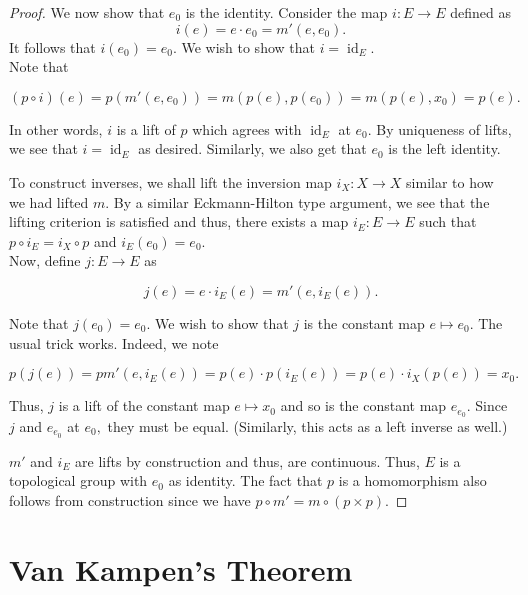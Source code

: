 \documentclass[12pt]{article}
\theoremstyle{definition}
\numberwithin{thm}{section}
\newcommand{\id}{\operatorname{id}}
\begin{document}
\begin{proof}
	We now show that $e_0$ is the identity. Consider the map $i:E \to E$ defined as
	\begin{equation*} 
		i(e) = e\cdot e_0 = m'(e, e_0).
	\end{equation*}
	It follows that $i(e_0) = e_0.$ We wish to show that $i = \id_E.$ \\
	Note that
	
	\begin{equation*} 
		(p\circ i)(e) = p(m'(e, e_0)) = m(p(e), p(e_0)) = m(p(e), x_0) = p(e).
	\end{equation*}
	
	In other words, $i$ is a lift of $p$ which agrees with $\id_E$ at $e_0.$ By uniqueness of lifts, we see that $i = \id_E$ as desired. Similarly, we also get that $e_0$ is the left identity.

	To construct inverses, we shall lift the inversion map $i_X:X \to X$ similar to how we had lifted $m.$ By a similar Eckmann-Hilton type argument, we see that the lifting criterion is satisfied and thus, there exists a map $i_E:E \to E$ such that $p\circ i_E = i_X\circ p$ and $i_E(e_0) = e_0.$\\
	Now, define $j:E \to E$ as
	
	\begin{equation*} 
		j(e) = e\cdot i_E(e) = m'(e, i_E(e)).
	\end{equation*}

	Note that $j(e_0) = e_0.$ We wish to show that $j$ is the constant map $e\mapsto e_0.$ The usual trick works. Indeed, we note

	\begin{equation*} 
		p(j(e)) = pm'(e, i_E(e)) = p(e)\cdot p(i_E(e)) = p(e)\cdot i_X(p(e)) = x_0.
	\end{equation*}

	Thus, $j$ is a lift of the constant map $e \mapsto x_0$ and so is the constant map $e_{e_0}.$ Since $j$ and $e_{e_0}$ at $e_0,$ they must be equal. (Similarly, this acts as a left inverse as well.)

	$m'$ and $i_E$ are lifts by construction and thus, are continuous. Thus, $E$ is a topological group with $e_0$ as identity. The fact that $p$ is a homomorphism also follows from construction since we have $p\circ m' = m\circ(p\times p).$
\end{proof}

\section{Van Kampen's Theorem} \label{sec:vankampen}
\end{document}
